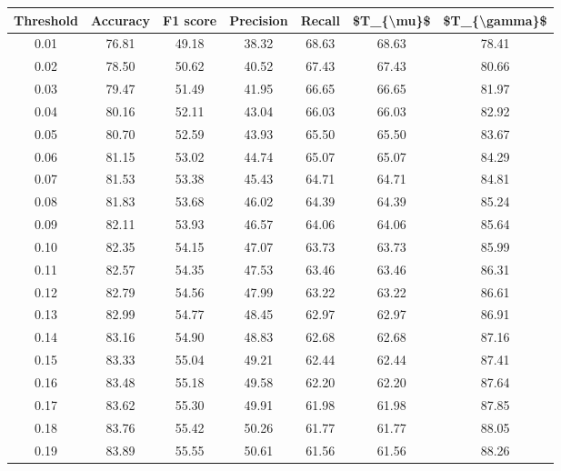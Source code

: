 \begin{tabular}{|c|c|c|c|c|c|c|}
\hline
 Threshold &  Accuracy &  F1 score &  Precision &  Recall &  \$T\_\{\textbackslash mu\}\$ &  \$T\_\{\textbackslash gamma\}\$ \\
\hline
      0.01 &     76.81 &     49.18 &      38.32 &   68.63 &      68.63 &         78.41 \\
      0.02 &     78.50 &     50.62 &      40.52 &   67.43 &      67.43 &         80.66 \\
      0.03 &     79.47 &     51.49 &      41.95 &   66.65 &      66.65 &         81.97 \\
      0.04 &     80.16 &     52.11 &      43.04 &   66.03 &      66.03 &         82.92 \\
      0.05 &     80.70 &     52.59 &      43.93 &   65.50 &      65.50 &         83.67 \\
      0.06 &     81.15 &     53.02 &      44.74 &   65.07 &      65.07 &         84.29 \\
      0.07 &     81.53 &     53.38 &      45.43 &   64.71 &      64.71 &         84.81 \\
      0.08 &     81.83 &     53.68 &      46.02 &   64.39 &      64.39 &         85.24 \\
      0.09 &     82.11 &     53.93 &      46.57 &   64.06 &      64.06 &         85.64 \\
      0.10 &     82.35 &     54.15 &      47.07 &   63.73 &      63.73 &         85.99 \\
      0.11 &     82.57 &     54.35 &      47.53 &   63.46 &      63.46 &         86.31 \\
      0.12 &     82.79 &     54.56 &      47.99 &   63.22 &      63.22 &         86.61 \\
      0.13 &     82.99 &     54.77 &      48.45 &   62.97 &      62.97 &         86.91 \\
      0.14 &     83.16 &     54.90 &      48.83 &   62.68 &      62.68 &         87.16 \\
      0.15 &     83.33 &     55.04 &      49.21 &   62.44 &      62.44 &         87.41 \\
      0.16 &     83.48 &     55.18 &      49.58 &   62.20 &      62.20 &         87.64 \\
      0.17 &     83.62 &     55.30 &      49.91 &   61.98 &      61.98 &         87.85 \\
      0.18 &     83.76 &     55.42 &      50.26 &   61.77 &      61.77 &         88.05 \\
      0.19 &     83.89 &     55.55 &      50.61 &   61.56 &      61.56 &         88.26 \\

\end{tabular}
